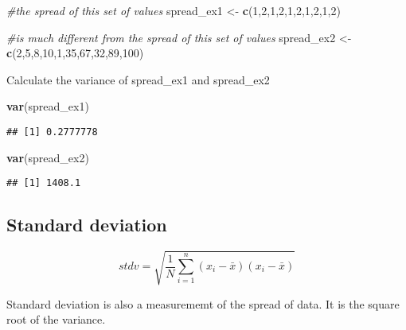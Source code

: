 \documentclass[11pt,]{article}
\newenvironment{Shaded}{\begin{snugshade}}{\end{snugshade}}
\newcommand{\KeywordTok}[1]{\textcolor[rgb]{0.13,0.29,0.53}{\textbf{#1}}}
\newcommand{\DecValTok}[1]{\textcolor[rgb]{0.00,0.00,0.81}{#1}}
\newcommand{\StringTok}[1]{\textcolor[rgb]{0.31,0.60,0.02}{#1}}
\newcommand{\CommentTok}[1]{\textcolor[rgb]{0.56,0.35,0.01}{\textit{#1}}}
\newcommand{\NormalTok}[1]{#1}
\begin{document}
\begin{Shaded}
\begin{Highlighting}[]
\CommentTok{#the spread of this set of values }
\NormalTok{spread_ex1 <-}\StringTok{ }\KeywordTok{c}\NormalTok{(}\DecValTok{1}\NormalTok{,}\DecValTok{2}\NormalTok{,}\DecValTok{1}\NormalTok{,}\DecValTok{2}\NormalTok{,}\DecValTok{1}\NormalTok{,}\DecValTok{2}\NormalTok{,}\DecValTok{1}\NormalTok{,}\DecValTok{2}\NormalTok{,}\DecValTok{1}\NormalTok{,}\DecValTok{2}\NormalTok{)}

\CommentTok{#is much different from the spread of this set of values}
\NormalTok{spread_ex2 <-}\StringTok{ }\KeywordTok{c}\NormalTok{(}\DecValTok{2}\NormalTok{,}\DecValTok{5}\NormalTok{,}\DecValTok{8}\NormalTok{,}\DecValTok{10}\NormalTok{,}\DecValTok{1}\NormalTok{,}\DecValTok{35}\NormalTok{,}\DecValTok{67}\NormalTok{,}\DecValTok{32}\NormalTok{,}\DecValTok{89}\NormalTok{,}\DecValTok{100}\NormalTok{)}
\end{Highlighting}
\end{Shaded}

Calculate the variance of spread\_ex1 and spread\_ex2

\begin{Shaded}
\begin{Highlighting}[]
\KeywordTok{var}\NormalTok{(spread_ex1)}
\end{Highlighting}
\end{Shaded}

\begin{verbatim}
## [1] 0.2777778
\end{verbatim}

\begin{Shaded}
\begin{Highlighting}[]
\KeywordTok{var}\NormalTok{(spread_ex2)}
\end{Highlighting}
\end{Shaded}

\begin{verbatim}
## [1] 1408.1
\end{verbatim}

\subsection{Standard deviation}\label{standard-deviation}

\[stdv=\sqrt{\frac{1}{N}\sum_{i=1}^{n}(x_i - \bar{x})(x_i - \bar{x})}\]

Standard deviation is also a measurememt of the spread of data. It is
the square root of the variance.
\end{document}
